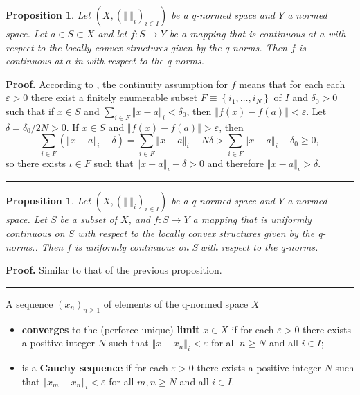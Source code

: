 \documentclass[11pt]{article}%
\newtheorem{proposition}[theorem]{Proposition}
\newenvironment{proof}[1][Proof]{\noindent\textbf{#1.} }{\ \rule{0.5em}{0.5em}}
\begin{document}
\begin{proposition}
\label{mar31p1}Let $\left(  X,\left(  \left\Vert \ \right\Vert _{i}\right)
_{i\in I}\right)  $ be a q-normed space and $Y$ a normed space. Let $a\in
S\subset X$ and let $f:S\rightarrow Y$ be a mapping that is continuous at $a$
with respect to the locally convex structures given by the q-norms. Then $f$
is continuous at $a$ in with respect to the q-norms.
\end{proposition}

\begin{proof}
According to \cite{dsbconvex}, the continuity assumption for $f$ means that
for each each $\varepsilon>0$ there exist a finitely enumerable subset
$F\equiv\left\{  i_{1},\ldots,i_{N}\right\}  $ of $I$ and $\delta_{0}>0$ such
that if $x\in S$ and $\sum_{i\in F}\left\Vert x-a\right\Vert _{i}<\delta_{0}$,
then $\left\Vert f(x)-f(a)\right\Vert <\varepsilon$. Let $\delta=\delta
_{0}/2N>0$. If $x\in S$ and $\left\Vert f(x)-f(a)\right\Vert >\varepsilon$,
then%
\[
\sum_{i\in F}(\left\Vert x-a\right\Vert _{i}-\delta)=\sum_{i\in F}\left\Vert
x-a\right\Vert _{i}-N\delta>\sum_{i\in F}\left\Vert x-a\right\Vert _{i}%
-\delta_{0}\geq0,
\]
so there exists $\iota\in F$ such that $\left\Vert x-a\right\Vert _{\iota
}-\delta>0$ and therefore $\left\Vert x-a\right\Vert _{\iota}>\delta$.
\end{proof}

\begin{proposition}
\label{apr08p1}Let $\left(  X,\left(  \left\Vert \ \right\Vert _{i}\right)
_{i\in I}\right)  $ be a q-normed space and $Y$ a normed space. Let $S$ be a
subset of $X$, and $f:S\rightarrow Y$ a mapping that is uniformly continuous
on $S$ with respect to the locally convex structures given by the q-norms..
Then $f$ is uniformly continuous on $S\ $with respect to the q-norms.
\end{proposition}

\begin{proof}
Similar to that of the previous proposition.
\end{proof}

%

\medskip


A sequence $\left(  x_{n}\right)  _{n\geq1}$ of elements of the q-normed space
$X$

\begin{itemize}
\item \textbf{converges} to the (perforce unique) \textbf{limit} $x\in X$ if
for each $\varepsilon>0$ there exists a positive integer $N$ such that
$\left\Vert x-x_{n}\right\Vert _{i}<\varepsilon$ for all $n\geq N$ and all
$i\in I$;

\item is a \textbf{Cauchy sequence} if for each $\varepsilon>0$ there exists a
positive integer $N$ such that $\left\Vert x_{m}-x_{n}\right\Vert
_{i}<\varepsilon$ for all $m,n\geq N$ and all $i\in I$.
\end{itemize}
\end{document}

